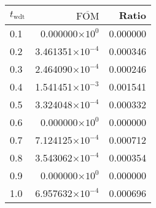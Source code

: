 \begin{tabular}{lrr}
\toprule
$t_{\mathrm{wdt}}$ & $\overline{\mathrm{FOM}}$ &    Ratio \\
\midrule
               0.1 &   0.000000$\times 10^{0}$ & 0.000000 \\
               0.2 &  3.461351$\times 10^{-4}$ & 0.000346 \\
               0.3 &  2.464090$\times 10^{-4}$ & 0.000246 \\
               0.4 &  1.541451$\times 10^{-3}$ & 0.001541 \\
               0.5 &  3.324048$\times 10^{-4}$ & 0.000332 \\
               0.6 &   0.000000$\times 10^{0}$ & 0.000000 \\
               0.7 &  7.124125$\times 10^{-4}$ & 0.000712 \\
               0.8 &  3.543062$\times 10^{-4}$ & 0.000354 \\
               0.9 &   0.000000$\times 10^{0}$ & 0.000000 \\
               1.0 &  6.957632$\times 10^{-4}$ & 0.000696 \\
\bottomrule
\end{tabular}
